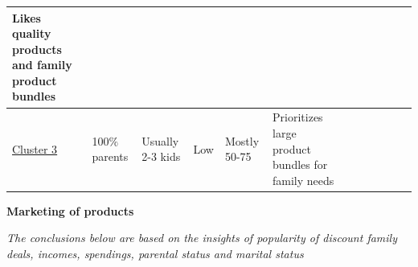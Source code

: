 \documentclass[11pt]{article}
\begin{document}
\begin{table}[H]
\begin{adjustbox}{max width=\textwidth}
\begin{tabular}{p{1.98cm}p{2.17cm}p{2.59cm}p{1.93cm}p{2.51cm}p{2.99cm}p{1.98cm}p{2.17cm}p{2.59cm}p{1.93cm}p{2.51cm}p{2.99cm}}
\multicolumn{1}{|p{2.99cm}|}{\centering
{\footnotesize Likes quality products and family product bundles}} \\ 
\hline
\multicolumn{1}{|p{1.98cm}}{\centering
\uline{\textcolor[HTML]{674EA7}{Cluster 3}}} & 
\multicolumn{1}{|p{2.17cm}}{\centering
{\footnotesize 100$\%$ parents}} & 
\multicolumn{1}{|p{2.59cm}}{\centering
{\footnotesize Usually 2-3 kids}} & 
\multicolumn{1}{|p{1.93cm}}{\centering
{\footnotesize Low}} & 
\multicolumn{1}{|p{2.51cm}}{\centering
{\footnotesize Mostly 50-75}} & 
\multicolumn{1}{|p{2.99cm}|}{\centering
{\footnotesize Prioritizes large product bundles for family needs}} \\ 
\hline
\end{tabular}
\end{adjustbox}
\end{table}
\vspace{5\baselineskip}

\textbf{Marketing of products}


\textit{The conclusions below are based on the insights of popularity of discount family deals, incomes, spendings, parental status and marital status}
\end{document}
